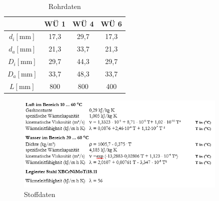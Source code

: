 \begin{table}[h!]
	\centering
	\caption{Rohrdaten}
	\label{tab:rohrdaten}%
	\renewcommand{\arraystretch}{1.2}
		\begin{tabulary}{1.15\textwidth}{C|CCC}
			\hline
			&\textbf{WÜ 1} & \textbf{WÜ 4} & \textbf{WÜ 6}\\
			\hline
			$d_i \left[\si{\milli \meter}\right]$&17,3&29,7&17,3\\
			$d_a \left[\si{\milli \meter}\right]$&21,3&33,7&21,3\\
			$D_i \left[\si{\milli \meter}\right]$&29,7&44,3&29,7\\
			$D_a \left[\si{\milli \meter}\right]$&33,7&48,3&33,7\\	
			$L \left[\si{\milli \meter}\right]$&800&800&400\\
			\hline
	\end{tabulary}
\end{table}%
\FloatBarrier
\newpage
\begin{figure}[h!]
	\centering
	\includegraphics[width=0.9\textwidth]{img/Daten}
	\caption{Stoffdaten}
	\label{fig:stoffdaten}
\end{figure}
\FloatBarrier


